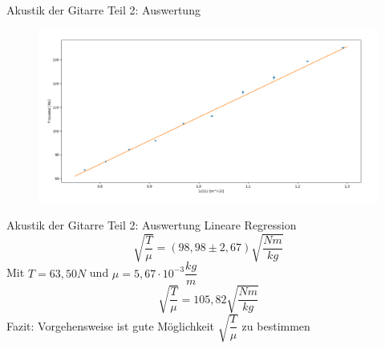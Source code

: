 \documentclass[12pt]{beamer}
\begin{document}
\begin{frame}{Akustik der Gitarre Teil 2: Auswertung}
	\begin{figure}
		\includegraphics[scale=0.3]{Bilder/SpannungMassebelagLineareRegression.PNG}
	\end{figure}
\end{frame}

\begin{frame}{Akustik der Gitarre Teil 2: Auswertung}
	Lineare Regression
	\[\sqrt{\dfrac{T}{\mu}} = (98,98 \pm 2,67)\sqrt{\dfrac{Nm}{kg}}\]
	Mit $T = 63,50N$ und $\mu = 5,67 \cdot 10^{-3} \dfrac{kg}{m}$
	\[\sqrt{\dfrac{T}{\mu}} = 105,82 \sqrt{\dfrac{Nm}{kg}}\]
	Fazit: Vorgehensweise ist gute Möglichkeit $\sqrt{\dfrac{T}{\mu}}$ zu bestimmen
\end{frame}





	
\end{document}
